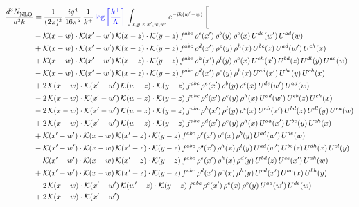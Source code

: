 \documentclass[9pt]{article}
\numberwithin{equation}{section}
\begin{document}
\begin{align}
     \frac{d^{3}N_{\rm NLO}^{\rm}}{d^{3}k}  & = \frac{1}{(2\pi)^{3}}\, \frac{ig^{4}}{16\pi^{5}}\, \frac{1}{k^{+}}\,{\color{blue}\log{\left[\frac{k^{+}}{\Lambda}\right]}}\, \int_{x,y,z,x^{\prime},w,w^{\prime}}e^{-ik(w^{\prime}-w)}\, \Bigg[\notag \\ & -\mathcal{K}(x-w)\cdot \mathcal{K}(x'-w')\, \mathcal{K}(x-z)\cdot \mathcal{K}(y-z)\, f^{abc}\, \rho^{e}(x')\,\rho^{b}(y)\,\rho^{c}(x)\,U^{de}(w')\,U^{ad}(w)\notag \\ & + \mathcal{K}(x-w)\cdot \mathcal{K}(x'-w')\, \mathcal{K}(x-z)\cdot \mathcal{K}(y-z)\, f^{abc}\, \rho^{d}(x')\,\rho^{e}(y)\,\rho^{h}(x)\,U^{be}(z)\,U^{ad}(w')\,U^{ch}(x)\notag \\ & + \mathcal{K}(x-w)\cdot \mathcal{K}(x'-w')\, \mathcal{K}(x-z)\cdot \mathcal{K}(y-z)\, f^{abc}\, \rho^{h}(x')\,\rho^{l}(y)\,\rho^{c}(x)\,U^{eh}(x')\,U^{bd}(z)\,U^{dl}(y)\,U^{ae}(w)\notag \\ & -\mathcal{K}(x-w)\cdot \mathcal{K}(x'-w')\, \mathcal{K}(x-z)\cdot \mathcal{K}(y-z)\, f^{abc}\, \rho^{d}(x')\,\rho^{e}(y)\,\rho^{h}(x)\,U^{ad}(x')\,U^{be}(y)\,U^{ch}(x)\notag \\ & + 2\,\mathcal{K}(x-w)\cdot \mathcal{K}(x'-w')\, \mathcal{K}(w-z)\cdot \mathcal{K}(y-z)\, f^{abc}\, \rho^{e}(x')\,\rho^{b}(y)\,\rho^{c}(x)\,U^{de}(w')\,U^{ad}(w)\notag \\ & - 2\,\mathcal{K}(x-w)\cdot \mathcal{K}(x'-w')\, \mathcal{K}(w-z)\cdot \mathcal{K}(y-z)\, f^{abc}\, \rho^{d}(x')\,\rho^{e}(y)\,\rho^{h}(x)\,U^{ad}(w')\,U^{eb}(z)\,U^{ch}(x)\notag \\ & - 2\,\mathcal{K}(x-w)\cdot \mathcal{K}(x'-w')\, \mathcal{K}(w-z)\cdot \mathcal{K}(y-z)\, f^{abc}\, \rho^{h}(x')\,\rho^{l}(y)\,\rho^{c}(x)\,U^{eh}(x')\,U^{bd}(z)\,U^{dl}(y)\,U^{ea}(w)\notag \\ &  + 2\,\mathcal{K}(x-w)\cdot \mathcal{K}(x'-w')\, \mathcal{K}(w-z)\cdot \mathcal{K}(y-z)\, f^{abc}\, \rho^{d}(x')\,\rho^{e}(y)\,\rho^{h}(x)\,U^{da}(x')\,U^{be}(y)\,U^{ch}(x)\notag \\ & + \mathcal{K}(x'-w')\cdot \mathcal{K}(x-w)\, \mathcal{K}(x'-z)\cdot \mathcal{K}(y-z)\, f^{abc}\,\rho^{c}(x')\,\rho^{e}(x)\,\rho^{b}(y)\, U^{ad}(w')\,U^{de}(w)\notag \\ & -\mathcal{K}(x'-w')\cdot \mathcal{K}(x-w)\, \mathcal{K}(x'-z)\cdot \mathcal{K}(y-z)\, f^{abc}\,\rho^{c}(x')\,\rho^{h}(x)\,\rho^{l}(y)\, U^{ad}(w')\,U^{be}(z)\,U^{dh}(x)\,U^{el}(y)\notag \\ & -\mathcal{K}(x'-w')\cdot \mathcal{K}(x-w)\, \mathcal{K}(x'-z)\cdot \mathcal{K}(y-z)\, f^{abc}\,\rho^{e}(x')\,\rho^{h}(x)\,\rho^{d}(y)\, U^{bd}(z)\,U^{ce}(x')\,U^{ah}(w)\notag \\ & +\mathcal{K}(x'-w')\cdot \mathcal{K}(x-w)\, \mathcal{K}(x'-z)\cdot \mathcal{K}(y-z)\, f^{abc}\,\rho^{d}(x')\,\rho^{e}(x)\,\rho^{h}(y)\, U^{cd}(x')\,U^{ae}(x)\,U^{bh}(y)\notag \\ & -2\, \mathcal{K}(x-w)\cdot \mathcal{K}(x'-w')\, \mathcal{K}(w'-z)\cdot \mathcal{K}(y-z)\, f^{abc}\,\rho^{c}(x')\,\rho^{e}(x)\,\rho^{b}(y)\,U^{ad}(w')\,U^{de}(w)\notag \\ & +2\, \mathcal{K}(x-w)\cdot \mathcal{K}(x'-w')\, 
\end{align}
\end{document}

